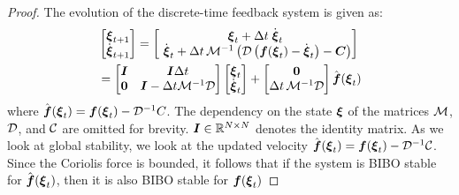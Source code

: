 \begin{proof}
The evolution of the discrete-time feedback system is given as:
\begin{equation}
	\begin{split}
	& \begin{bmatrix}
	 \vecs \xi_{t+1} \\ \dot{\vecs \xi}_{t+1}
	\end{bmatrix}
	=
	\begin{bmatrix}
		\vect \xi_t + \Delta t  \; \dot{\vect \xi}_t \\ \
		\dot{\vecs \xi}_t + \Delta t \, \matd{M}^{-1} \left( \matd{D} \left( \vect f(\vecs \xi_t) - \dot{\vecs \xi}_t \right) - \matr C \right)
	\end{bmatrix} \\
	&  = %
	\begin{bmatrix}
		\matr{I} & \matr{I} \Delta t \\
		\vect{0} & \matr{I} - \Delta t \matd{M}^{-1} \matd D 
	\end{bmatrix}
	\begin{bmatrix}
		\vect \xi_t \\ \dot{\vect \xi}_t
	\end{bmatrix}
	+ \begin{bmatrix}
		\vect{0} \\ 
		\Delta t \, \matd{M}^{-1} \matd{D} 
	\end{bmatrix}
	\hat{\vect f}(\vecs \xi_t) 
	\label{eq:discrete_time_proof}
	\end{split}
\end{equation}
where $\hat{\boldsymbol{f}}(\boldsymbol{\xi}_t) = \boldsymbol{f}(\boldsymbol{\xi}_t) - \mathcal{D}^{-1} C$.  The dependency on the state $\boldsymbol{\xi}$ of the matrices $\mathcal{M}$, $\mathcal{D}$, and $\mathcal{C}$ are omitted for brevity. $\boldsymbol{I} \in \mathbb{R}^{N \times N}$ denotes the identity matrix.
As we look at global stability, we look at the updated velocity $\hat{\boldsymbol{f}}(\boldsymbol{\xi}_t) = \boldsymbol{f}(\boldsymbol{\xi}_t) - \mathcal{D}^{-1} \mathcal{C}$. Since the Coriolis force is bounded, it follows that if the system is BIBO stable for $\hat{\boldsymbol{f}}(\boldsymbol{\xi}_t)$, then it is also BIBO stable for $\boldsymbol{f}(\boldsymbol{\xi}_t)$ 


\end{proof}
